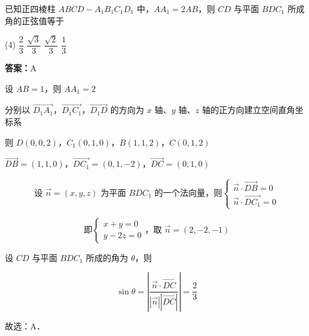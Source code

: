 \vspace{2em}

\begin{example}[\bkstar{3}{5}]
已知正四棱柱 $ABCD-A_1B_1C_1D_1$ 中，$AA_1=2AB$，则 $CD$ 与平面 $BDC_1$ 所成角的正弦值等于
\begin{tasks}(4)
    \task $\dfrac{2}{3}$
    \task $\dfrac{\sqrt{3}}{3}$
    \task $\dfrac{\sqrt{2}}{3}$
    \task $\dfrac{1}{3}$
\end{tasks}
\end{example}
\begin{solution}
\textbf{答案：}A

设 $AB=1$，则 $AA_1=2$

分别以 $\overrightarrow{D_1A_1}$，$\overrightarrow{D_1C_1}$，$\overrightarrow{D_1D}$ 的方向为 $x$ 轴、$y$ 轴、$z$ 轴的正方向建立空间直角坐标系

则 $D(0,0,2)$，$C_1(0,1,0)$，$B(1,1,2)$，$C(0,1,2)$

$\overrightarrow{DB}=(1,1,0)$，$\overrightarrow{DC_1}=(0,1,-2)$，$\overrightarrow{DC}=(0,1,0)$

$$
\text{设 }\overrightarrow{n}=(x,y,z)\text{ 为平面 }BDC_1\text{ 的一个法向量，则}\left\{\begin{array}{l}
\overrightarrow{n}\cdot\overrightarrow{DB}=0\\
\overrightarrow{n}\cdot\overrightarrow{DC_1}=0
\end{array}\right.
$$

$$
\text{即}\left\{\begin{array}{l}
x+y=0\\
y-2z=0
\end{array}\right.\text{，取 }\overrightarrow{n}=(2,-2,-1)
$$

设 $CD$ 与平面 $BDC_1$ 所成的角为 $\theta$，则

$$
\sin\theta=\left|\dfrac{\overrightarrow{n}\cdot\overrightarrow{DC}}{\left|\overrightarrow{n}\right|\left|\overrightarrow{DC}\right|}\right|=\dfrac{2}{3}
$$

故选：A．
\end{solution}

\vspace{2em}


